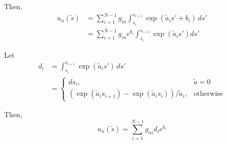 Then,
\begin{align}
  u_n(\tilde{s}) &= \sum_{i=1}^{N-1}g_{ni}\int_{s_i}^{s_{i+1}}  \exp\left(\tilde{a}_{i}s' + b_i\right)\, ds' \\
                 &= \sum_{i=1}^{N-1}g_{ni}e^{b_i}\int_{s_i}^{s_{i+1}}  \exp\left(\tilde{a}_{i}s'\right) ds'
\end{align}

Let
\begin{align}
  d_i &= \int_{s_i}^{s_{i+1}}  \exp\left(\tilde{a}_{i}s'\right)\, ds' \\
    &= \begin{cases}
    ds_i, & \tilde{a} = 0 \\
      \left( \exp(\tilde{a}_i s_{i+1}) - \exp(\tilde{a}_i s_i) \right)/\tilde{a}_i, & \mbox{otherwise}
    \end{cases}
\end{align}

Then,
\begin{equation}
  u_n(\tilde{s}) = \sum_{i=1}^{N-1} g_{ni}d_i e^{b_i}
\end{equation}

